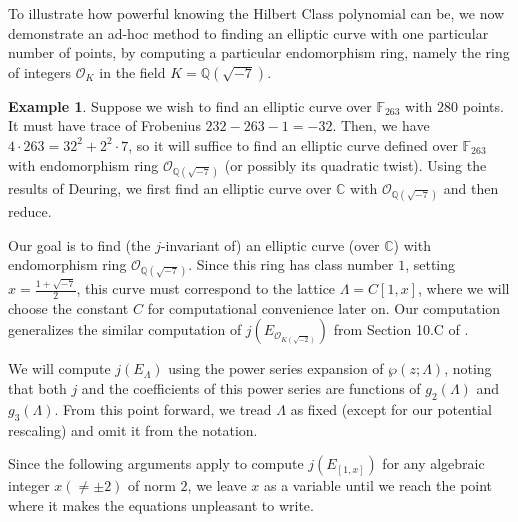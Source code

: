 \documentclass{amsart}
\theoremstyle{definition}
\newtheorem{example}[thm]{Example}
\theoremstyle{remark}
\numberwithin{equation}{section}
\newcommand{\cO}{\mathcal O}
\newcommand{\bbC}{\mathbb C}
\newcommand{\bbF}{\mathbb F}
\newcommand{\bbQ}{\mathbb Q}
\begin{document}
 To illustrate how powerful knowing the Hilbert Class polynomial can be, we now demonstrate an ad-hoc method to finding an elliptic curve with one particular number of points, by computing a particular endomorphism ring, namely the ring of integers $\cO_{K}$ in the field $K = \bbQ(\sqrt{-7})$. 
 
 \begin{example}
 Suppose we wish to find an elliptic curve over $\bbF_{263}$ with $280$ points. It must have trace of Frobenius $232 - 263 - 1 = -32$. Then, we have $4 \cdot 263 = 32^2 + 2^2 \cdot 7$, so it will suffice to find an elliptic curve defined over $\bbF_{263}$ with endomorphism ring $\cO_{\bbQ(\sqrt{-7})}$ (or possibly its quadratic twist). Using the results of Deuring, we first find an elliptic curve over $\bbC$ with $\cO_{\bbQ(\sqrt{-7})}$ and then reduce.
 
 Our goal is to find (the $j$-invariant of) an elliptic curve (over $\bbC$) with endomorphism ring $\cO_{\bbQ(\sqrt{-7})}$. Since this ring has class number $1$, setting $x = \frac{1 + \sqrt{-7}}{2}$, this curve must correspond to the lattice $\Lambda = C [1,x]$, where we will choose the constant $C$ for computational convenience later on. Our computation generalizes the similar computation of $j(E_{\cO_{K(\sqrt{-2})}})$ from Section 10.C of \cite{CoxPrimes}.
 
 We will compute $j\left(E_{\Lambda}\right)$ using the power series expansion of $\wp(z;\Lambda)$, noting that both $j$ and the coefficients of this power series are functions of $g_{2}(\Lambda)$ and $g_{3}(\Lambda)$. From this point forward, we tread $\Lambda$ as fixed (except for our potential rescaling) and omit it from the notation.
 
 Since the following arguments apply to compute $j\left(E_{[1,x]}\right)$ for any algebraic integer $x (\neq \pm 2)$ of norm $2$, we leave $x$ as a variable until we reach the point where it makes the equations unpleasant to write. 
 

\end{example}
\end{document}

